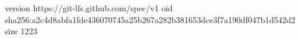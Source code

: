 version https://git-lfs.github.com/spec/v1
oid sha256:a2c4d8abfa1fde436070745a25b267a282b381653dce3f7a190df047b1d542d2
size 1223
